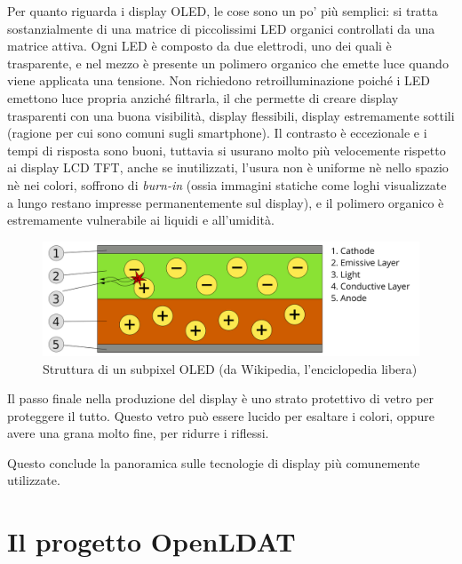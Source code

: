 Per quanto riguarda i display OLED, le cose sono un po' più semplici: si tratta sostanzialmente di una matrice di piccolissimi LED organici controllati da una matrice attiva. Ogni LED è composto da due elettrodi, uno dei quali è trasparente, e nel mezzo è presente un polimero organico che emette luce quando viene applicata una tensione. Non richiedono retroilluminazione poiché i LED emettono luce propria anziché filtrarla, il che permette di creare display trasparenti con una buona visibilità, display flessibili, display estremamente sottili (ragione per cui sono comuni sugli smartphone). Il contrasto è eccezionale e i tempi di risposta sono buoni, tuttavia si usurano molto più velocemente rispetto ai display LCD TFT, anche se inutilizzati, l'usura non è uniforme nè nello spazio nè nei colori, soffrono di \textit{burn-in} (ossia immagini statiche come loghi visualizzate a lungo restano impresse permanentemente sul display), e il polimero organico è estremamente vulnerabile ai liquidi e all'umidità.

\begin{figure}[h]
	\centering
	\includegraphics[width=\textwidth]{Introduzione_files/oled.png}
	\caption{Struttura di un subpixel OLED (da Wikipedia, l'enciclopedia libera)}
	\label{fig:oled}
\end{figure}

Il passo finale nella produzione del display è uno strato protettivo di vetro per proteggere il tutto. Questo vetro può essere lucido per esaltare i colori, oppure avere una grana molto fine, per ridurre i riflessi.

Questo conclude la panoramica sulle tecnologie di display più comunemente utilizzate.

\section{Il progetto OpenLDAT}
